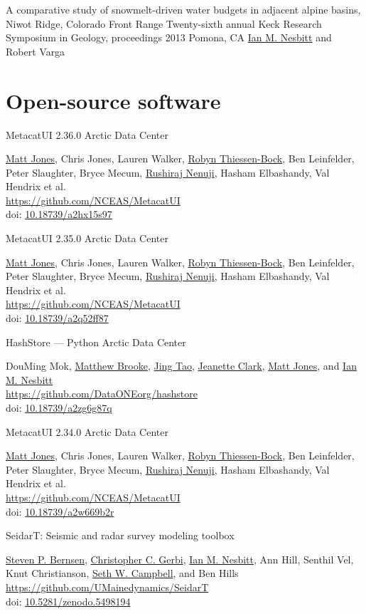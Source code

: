 \documentclass[a4paper,12pt,sans,colorlinks]{moderncv}
\newcommand{\me}{\href{https://www.iannesbitt.org}{Ian M. Nesbitt}}
\newcommand{\seth}{\href{https://www.alpinesciences.net}{Seth W. Campbell}}
\newcommand{\stevebernsen}{\href{https://watc.alaska.edu/node/73}{Steven P. Bernsen}}
\newcommand{\chris}{\href{https://umaine.edu/earthclimate/people/christopher-gerbi/}{Christopher C. Gerbi}}
\newcommand{\mattjones}{\href{https://orcid.org/0000-0003-0077-4738}{Matt Jones}}
\newcommand{\chrisjones}{Chris Jones}
\newcommand{\laurenwalker}{Lauren Walker}
\newcommand{\robynthiessenbock}{\href{https://orcid.org/0000-0002-1615-3963}{Robyn Thiessen-Bock}}
\newcommand{\benleinfelder}{Ben Leinfelder}
\newcommand{\peterslaughter}{Peter Slaughter}
\newcommand{\brycemecum}{Bryce Mecum}
\newcommand{\rushirajnenuji}{\href{https://orcid.org/0000-0003-4678-5213}{Rushiraj Nenuji}}
\newcommand{\hashamelbashandy}{Hasham Elbashandy}
\newcommand{\valhendrix}{Val Hendrix}
\newcommand{\doumingmok}{DouMing Mok}
\newcommand{\matthewbrooke}{\href{https://orcid.org/0000-0002-1472-913X}{Matthew Brooke}}
\newcommand{\jingtao}{\href{https://orcid.org/0000-0002-1209-5268}{Jing Tao}}
\newcommand{\jeanetteclark}{\href{https://orcid.org/0000-0003-4703-1974}{Jeanette Clark}}
\newcommand{\metacatui}{\href{https://github.com/NCEAS/MetacatUI}{https://github.com/NCEAS/MetacatUI}}
\newcommand{\doi}[1]{%
    \href{https://doi.org/#1}{#1}
}
\begin{document}
{A comparative study of snowmelt-driven water budgets in
adjacent alpine basins, Niwot Ridge, Colorado Front Range}
{Twenty-sixth annual Keck Research Symposium in Geology, proceedings 2013}
{Pomona, CA}
{}
{
    \me{} and Robert Varga
}


\section{Open-source software}

{MetacatUI 2.36.0}
{Arctic Data Center}
{}
{}
{
    \mattjones{}, \chrisjones{}, \laurenwalker{}, \robynthiessenbock{}, \benleinfelder{},
    \peterslaughter{}, \brycemecum{}, \rushirajnenuji{}, \hashamelbashandy{}, \valhendrix{} et al.
    \\
    \metacatui{}
    \\
    doi: \doi{10.18739/a2hx15s97}
}

{MetacatUI 2.35.0}
{Arctic Data Center}
{}
{}
{
    \mattjones{}, \chrisjones{}, \laurenwalker{}, \robynthiessenbock{}, \benleinfelder{},
    \peterslaughter{}, \brycemecum{}, \rushirajnenuji{}, \hashamelbashandy{}, \valhendrix{} et al.
    \\
    \metacatui{}
    \\
    doi: \doi{10.18739/a2q52ff87}
}

{HashStore — Python}
{Arctic Data Center}
{}
{}
{
    \doumingmok{}, \matthewbrooke{}, \jingtao{}, \jeanetteclark{}, \mattjones{}, and \me{}
    \\
    \url{https://github.com/DataONEorg/hashstore}
    \\
    doi: \doi{10.18739/a2zg6g87q}
}

{MetacatUI 2.34.0}
{Arctic Data Center}
{}
{}
{
    \mattjones{}, \chrisjones{}, \laurenwalker{}, \robynthiessenbock{}, \benleinfelder{},
    \peterslaughter{}, \brycemecum{}, \rushirajnenuji{}, \hashamelbashandy{}, \valhendrix{} et al.
    \\
    \metacatui{}
    \\
    doi: \doi{10.18739/a2w669b2r}
}

{SeidarT: Seismic and radar survey modeling toolbox}
{}
{}
{}
{
    \stevebernsen{}, \chris{}, \me{}, Ann Hill, Senthil Vel,
    Knut Christianson, \seth{}, and Ben Hills
    \\
    \url{https://github.com/UMainedynamics/SeidarT}
    \\
    doi: \doi{10.5281/zenodo.5498194}
}
\end{document}
